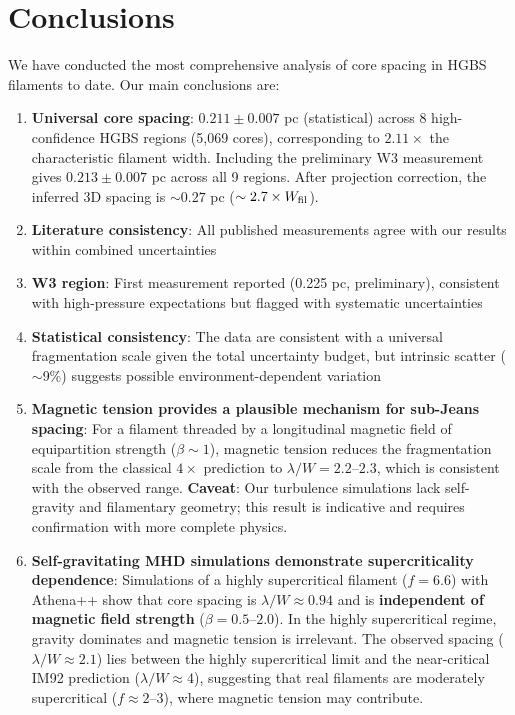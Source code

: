 \documentclass[11pt,a4paper]{article}
\begin{document}
\section{Conclusions}

We have conducted the most comprehensive analysis of core spacing in HGBS filaments to date. Our main conclusions are:

\begin{enumerate}
    \item \textbf{Universal core spacing}: $0.211 \pm 0.007$ pc (statistical) across 8 high-confidence HGBS regions (5,069 cores), corresponding to $2.11\times$ the characteristic filament width. Including the preliminary W3 measurement gives $0.213 \pm 0.007$ pc across all 9 regions. After projection correction, the inferred 3D spacing is $\sim0.27$ pc ($\sim2.7\times W_{\rm fil}$).
    \item \textbf{Literature consistency}: All published measurements agree with our results within combined uncertainties
    \item \textbf{W3 region}: First measurement reported (0.225 pc, preliminary), consistent with high-pressure expectations but flagged with systematic uncertainties
    \item \textbf{Statistical consistency}: The data are consistent with a universal fragmentation scale given the total uncertainty budget, but intrinsic scatter ($\sim$9\%) suggests possible environment-dependent variation
    \item \textbf{Magnetic tension provides a plausible mechanism for sub-Jeans spacing}: For a filament threaded by a longitudinal magnetic field of equipartition strength ($\beta \sim 1$), magnetic tension reduces the fragmentation scale from the classical $4\times$ prediction to $\lambda/W = 2.2$--$2.3$, which is consistent with the observed range. \textbf{Caveat}: Our turbulence simulations lack self-gravity and filamentary geometry; this result is indicative and requires confirmation with more complete physics.
    \item \textbf{Self-gravitating MHD simulations demonstrate supercriticality dependence}: Simulations of a highly supercritical filament ($f = 6.6$) with Athena++ show that core spacing is $\lambda/W \approx 0.94$ and is \textbf{independent of magnetic field strength} ($\beta = 0.5$--$2.0$). In the highly supercritical regime, gravity dominates and magnetic tension is irrelevant. The observed spacing ($\lambda/W \approx 2.1$) lies between the highly supercritical limit and the near-critical IM92 prediction ($\lambda/W \approx 4$), suggesting that real filaments are moderately supercritical ($f \approx 2$--$3$), where magnetic tension may contribute.

\end{enumerate}
\end{document}
